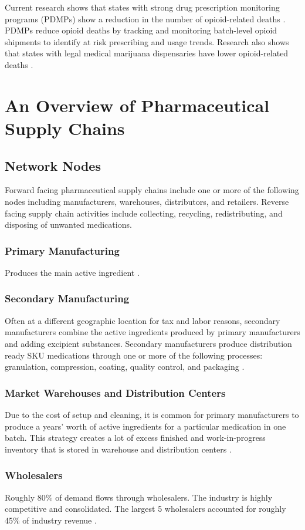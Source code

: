 \documentclass[sigconf]{acmart}
\begin{document}
Current research shows that states with strong drug prescription monitoring programs (PDMPs) show a reduction in the number of opioid-related deaths \cite{pardo01} \cite{patrick01}. PDMPs reduce opioid deaths by tracking and monitoring batch-level opioid shipments to identify at risk prescribing and usage trends. Research also shows that states with legal medical marijuana dispensaries have lower opioid-related deaths \cite{pardo01}.


\section{An Overview of Pharmaceutical Supply Chains}
\subsection{Network Nodes}
Forward facing pharmaceutical supply chains include one or more of the following nodes including manufacturers, warehouses, distributors, and retailers. Reverse facing supply chain activities include collecting, recycling, redistributing, and disposing of unwanted medications.  
\subsubsection{Primary Manufacturing} Produces the main active ingredient \cite{Shah01}.
\subsubsection{Secondary Manufacturing} Often at a different geographic location for tax and labor reasons, secondary manufacturers combine the active ingredients produced by primary manufacturers and adding excipient substances. Secondary manufacturers produce distribution ready SKU medications through one or more of the following processes: granulation, compression, coating, quality control, and packaging \cite{Shah01}.
\subsubsection{Market Warehouses and Distribution Centers} Due to the cost of setup and cleaning, it is common for primary manufacturers to produce a years' worth of active ingredients for a particular medication in one batch. This strategy creates a lot of excess finished and work-in-progress inventory that is stored in warehouse and distribution centers \cite{Shah01}.
\subsubsection{Wholesalers} Roughly 80\% of demand flows through wholesalers. The industry is highly competitive and consolidated. The largest 5 wholesalers accounted for roughly 45\% of industry revenue \cite{Shah01}\cite{Hoovers01}.
\end{document}
